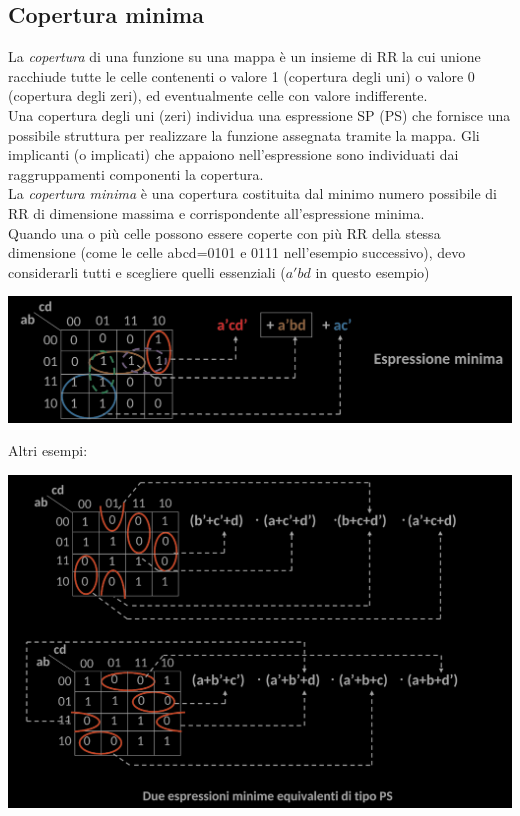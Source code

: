 \documentclass{article}
\begin{document}
\subsection{Copertura minima}
La \textit{copertura} di una funzione su una mappa è un insieme di RR la cui unione racchiude tutte le celle contenenti o valore 1 (copertura degli uni) o valore 0 (copertura degli zeri), ed eventualmente celle con valore indifferente.
\vspace{0.2cm}\\
Una copertura degli uni (zeri) individua una espressione SP (PS) che fornisce una possibile struttura per realizzare la funzione assegnata tramite la mappa. Gli implicanti (o implicati) che appaiono nell'espressione sono individuati dai raggruppamenti componenti la copertura.
\vspace{0.2cm}\\
La \textit{copertura minima} è una copertura costituita dal minimo numero possibile di RR di dimensione massima e corrispondente all'espressione minima.
\vspace{0.2cm}\\
Quando una o più celle possono essere coperte con più RR della stessa dimensione (come le celle abcd=0101 e 0111 nell'esempio successivo), devo considerarli tutti e scegliere quelli essenziali ($a'bd$ in questo esempio)
\begin{center}
    \includegraphics[scale=0.55]{copertura.png}
\end{center}
Altri esempi:
\begin{center}
    \includegraphics[scale=0.55]{escoper.png}
\end{center}
\end{document}
